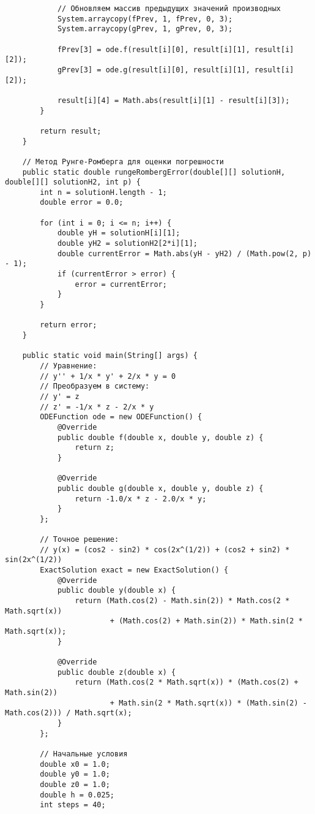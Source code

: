 \begin{verbatim}
            // Обновляем массив предыдущих значений производных
            System.arraycopy(fPrev, 1, fPrev, 0, 3);
            System.arraycopy(gPrev, 1, gPrev, 0, 3);

            fPrev[3] = ode.f(result[i][0], result[i][1], result[i][2]);
            gPrev[3] = ode.g(result[i][0], result[i][1], result[i][2]);

            result[i][4] = Math.abs(result[i][1] - result[i][3]);
        }

        return result;
    }

    // Метод Рунге-Ромберга для оценки погрешности
    public static double rungeRombergError(double[][] solutionH, double[][] solutionH2, int p) {
        int n = solutionH.length - 1;
        double error = 0.0;

        for (int i = 0; i <= n; i++) {
            double yH = solutionH[i][1];
            double yH2 = solutionH2[2*i][1];
            double currentError = Math.abs(yH - yH2) / (Math.pow(2, p) - 1);
            if (currentError > error) {
                error = currentError;
            }
        }

        return error;
    }

    public static void main(String[] args) {
        // Уравнение:
        // y'' + 1/x * y' + 2/x * y = 0
        // Преобразуем в систему:
        // y' = z
        // z' = -1/x * z - 2/x * y
        ODEFunction ode = new ODEFunction() {
            @Override
            public double f(double x, double y, double z) {
                return z;
            }

            @Override
            public double g(double x, double y, double z) {
                return -1.0/x * z - 2.0/x * y;
            }
        };

        // Точное решение:
        // y(x) = (cos2 - sin2) * cos(2x^(1/2)) + (cos2 + sin2) * sin(2x^(1/2))
        ExactSolution exact = new ExactSolution() {
            @Override
            public double y(double x) {
                return (Math.cos(2) - Math.sin(2)) * Math.cos(2 * Math.sqrt(x))
                        + (Math.cos(2) + Math.sin(2)) * Math.sin(2 * Math.sqrt(x));
            }

            @Override
            public double z(double x) {
                return (Math.cos(2 * Math.sqrt(x)) * (Math.cos(2) + Math.sin(2))
                        + Math.sin(2 * Math.sqrt(x)) * (Math.sin(2) - Math.cos(2))) / Math.sqrt(x);
            }
        };

        // Начальные условия
        double x0 = 1.0;
        double y0 = 1.0;
        double z0 = 1.0;
        double h = 0.025;
        int steps = 40;



\end{verbatim}
